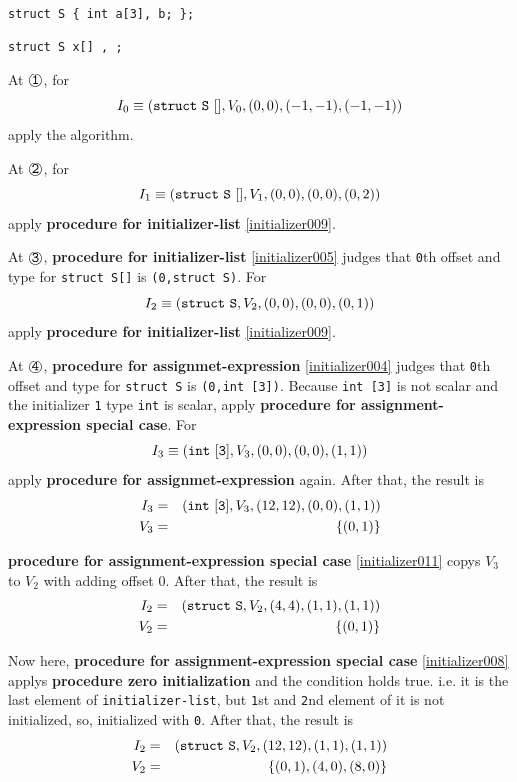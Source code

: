 \begin{Example}
\label{initializer013}

\

{\tt struct S \{ int a[3], b; \};}

{\tt struct S x[] 
 
  ,
  ;}

\noindent
At $\MARU{\tt 1}$, for
\[
I_0 \equiv ({\tt{struct\,\,S\,\,[]}}, V_0, (0,0),(-1,-1),(-1,-1))
\]
apply the algorithm.

\noindent
At $\MARU{\tt 2}$, for
\[
I_1 \equiv ({\tt{struct\,\,S\,\,[]}},V_1,(0,0),(0,0),(0,2)) 
\]
apply {\bf procedure for initializer-list} \ref{initializer009}.

\noindent
At $\MARU{\tt 3}$,
{\bf procedure for initializer-list}
\ref{initializer005} judges that
{\tt{0}}th offset and type for {\tt struct S[]} 
is {\tt (0,struct S)}. For
\[
I_2 \equiv ({\tt{struct\,\,S}},V_2,(0,0),(0,0),(0,1)) 
\]
apply
 {\bf procedure for initializer-list} \ref{initializer009}.

\noindent
At $\MARU{\tt 4}$,
{\bf procedure for assignmet-expression}
\ref{initializer004} judges that
{\tt{0}}th offset and type for {\tt struct S}
is {\tt (0,int [3])}.
Because {\tt int [3]} is not scalar and the initializer {\tt{1}}
type {\tt int} is scalar, apply
 {\bf procedure for assignment-expression special case}. For
\[
I_3 \equiv ({\tt{int\,\,[3]}},V_3,(0,0),(0,0),(1,1))
\]
apply {\bf procedure for assignmet-expression} again.
After that, the result is
\begin{eqnarray*}
I_3 & = & ({\tt{int\,\,[3]}},V_3,(12,12),(0,0),(1,1)) \\
V_3 & = & \{(0,1)\}
\end{eqnarray*}

{\bf procedure for assignment-expression special case}
\ref{initializer011} copys 
$V_3$ to $V_2$ with adding offset $0$.
After that, the result is
\begin{eqnarray*}
I_2 & = & ({\tt{struct\,\,S}}, V_2, (4,4),(1,1),(1,1)) \\
V_2 & = & \{(0,1)\}
\end{eqnarray*}

Now here,  {\bf procedure for assignment-expression special case}
 \ref{initializer008} applys {\bf procedure zero initialization}
and the condition holds true. i.e. it is the last element of
 {\tt{initializer-list}}, but {\tt{1}}st and {\tt{2}}nd element of it is not
 initialized, so, initialized with {\tt{0}}.
After that, the result is
\begin{eqnarray*}
I_2 & = & ({\tt{struct\,\,S}}, V_2, (12,12),(1,1),(1,1)) \\
V_2 & = & \{(0,1), (4,0), (8,0)\}
\end{eqnarray*}


\end{Example}
